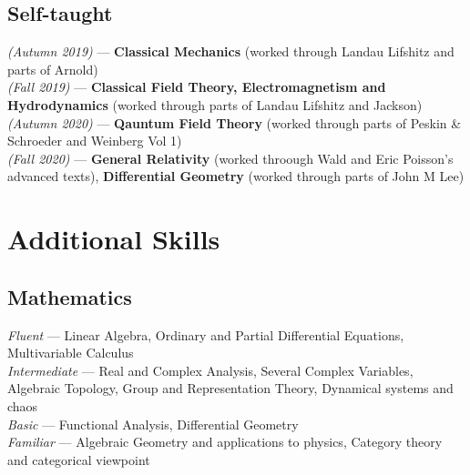 \documentclass[11pt, a4paper]{article}
\begin{document}
\subsection{\large Self-taught}
\hspace{0.01\linewidth}
\parbox{0.88\linewidth}{
    {\textit{(Autumn 2019)} --- \small \textbf{Classical Mechanics} (worked through Landau Lifshitz and parts of Arnold)} \\
    {\textit{(Fall 2019)} --- \small \textbf{Classical Field Theory, Electromagnetism and Hydrodynamics} (worked through parts of Landau Lifshitz and Jackson)} \\
    {\textit{(Autumn 2020)} --- \small \textbf{Qauntum Field Theory} (worked through parts of Peskin \& Schroeder and Weinberg Vol 1)} \\
    {\textit{(Fall 2020)} --- \small \textbf{General Relativity} (worked throough Wald and Eric Poisson's advanced texts), \textbf{Differential Geometry} (worked through parts of John M Lee)}
}


\section{Additional Skills}

\subsection{\large Mathematics}
\hspace{0.01\linewidth}
\parbox{0.88\linewidth}{
    {\textit{Fluent} --- \small Linear Algebra, Ordinary and Partial Differential Equations, Multivariable Calculus} \\
    {\textit{Intermediate} --- \small Real and Complex Analysis, Several Complex Variables, Algebraic Topology, Group and Representation Theory, Dynamical systems and chaos} \\
    {\textit{Basic} --- \small Functional Analysis, Differential Geometry} \\
    {\textit{Familiar} --- \small Algebraic Geometry and applications to physics, Category theory and categorical viewpoint}
}
\vspace{-0.3cm}
\end{document}
